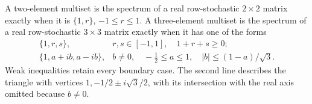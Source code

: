 \begin{theorem}
\label{thm:lowdim-stochastic}
A two-element multiset is the spectrum of a real row-stochastic
\(2\times2\) matrix exactly when it is \(\{1,r\}\), \(-1\leq r\leq1\).
A three-element multiset is the spectrum of a real row-stochastic
\(3\times3\) matrix exactly when it has one of the forms
\[
\begin{array}{ll}
\{1,r,s\},&r,s\in[-1,1],\quad 1+r+s\geq0;\\[2pt]
\{1,a+ib,a-ib\},& b\ne0,\quad -\tfrac12\leq a\leq1,\quad
 |b|\leq(1-a)/\sqrt3 .
\end{array}
\]
Weak inequalities retain every boundary case. The second line describes
the triangle with vertices \(1,-1/2\pm i\sqrt3/2\), with its intersection
with the real axis omitted because \(b\ne0\).
\end{theorem}
